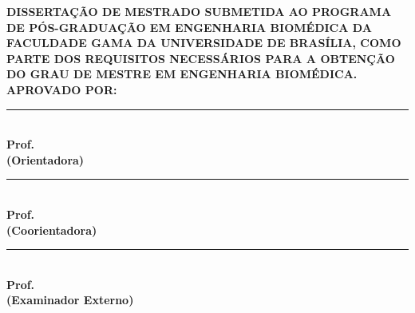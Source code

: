 \begin{folhadeaprovacao}
\begin{center}
    \vspace*{0in}
	{\textbf{\imprimirinstituicao}}
	\par
	{\textbf{\imprimirdepartamento}}

	\vspace{0.5 in}
	{\textbf{\large \imprimirtitulo}}
    	\vspace{0.25 in}
    	\par
         {\textbf{\large \imprimirautor}}
    	\vspace{0.25 in}
\end{center}
\textbf{DISSERTAÇÃO DE MESTRADO SUBMETIDA AO PROGRAMA DE PÓS-GRADUAÇÃO EM ENGENHARIA BIOMÉDICA DA FACULDADE GAMA DA
UNIVERSIDADE DE BRASÍLIA, COMO PARTE DOS REQUISITOS NECESSÁRIOS PARA A OBTENÇÃO DO GRAU DE MESTRE EM
ENGENHARIA BIOMÉDICA.}
\flushleft	
	\vspace{0.5 in}    
    \textbf{APROVADO POR:}\\
    \vspace{0.5 in}    
    \rule{10cm}{.1mm}\\
    {\textbf{Prof. \imprimirorientador} \\ \textbf{(Orientadora)} }\\
    \vspace{0.5 in}    
   \rule{10cm}{.1mm}\\ 
   {\textbf{Prof. \imprimirmembroCoorientador} \\ \textbf{(Coorientadora)}}\\
    \vspace{0.5 in}    
   \rule{10cm}{.1mm}\\
    {\textbf{Prof. \imprimirmembroconvidadodois} \\ \textbf{(Examinador Externo)}}\\
    
    \end{folhadeaprovacao}

